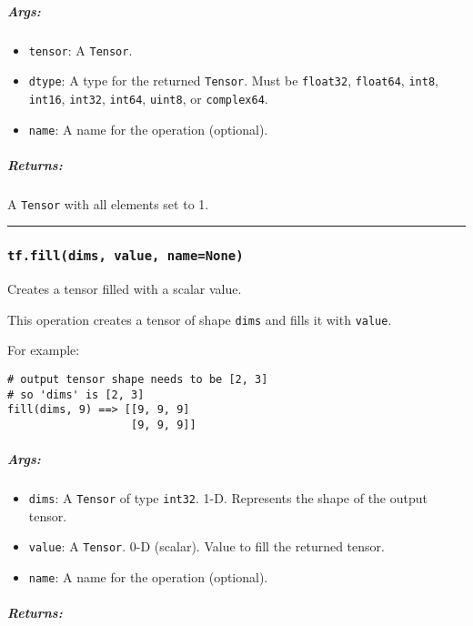 \subparagraph{Args: }\label{args-3}

\begin{itemize}
\item
  \texttt{tensor}: A \texttt{Tensor}.
\item
  \texttt{dtype}: A type for the returned \texttt{Tensor}. Must be
  \texttt{float32}, \texttt{float64}, \texttt{int8}, \texttt{int16},
  \texttt{int32}, \texttt{int64}, \texttt{uint8}, or \texttt{complex64}.
\item
  \texttt{name}: A name for the operation (optional).
\end{itemize}

\subparagraph{Returns: }\label{returns-3}

A \texttt{Tensor} with all elements set to 1.

\begin{center}\rule{0.5\linewidth}{\linethickness}\end{center}

\subsubsection{\texorpdfstring{\texttt{tf.fill(dims,\ value,\ name=None)}
}{tf.fill(dims, value, name=None) }}\label{tf.filldims-value-namenone}

Creates a tensor filled with a scalar value.

This operation creates a tensor of shape \texttt{dims} and fills it with
\texttt{value}.

For example:

\begin{verbatim}
# output tensor shape needs to be [2, 3]
# so 'dims' is [2, 3]
fill(dims, 9) ==> [[9, 9, 9]
                   [9, 9, 9]]
\end{verbatim}

\subparagraph{Args: }\label{args-4}

\begin{itemize}
\tightlist
\item
  \texttt{dims}: A \texttt{Tensor} of type \texttt{int32}. 1-D.
  Represents the shape of the output tensor.
\item
  \texttt{value}: A \texttt{Tensor}. 0-D (scalar). Value to fill the
  returned tensor.
\item
  \texttt{name}: A name for the operation (optional).
\end{itemize}

\subparagraph{Returns: }\label{returns-4}

